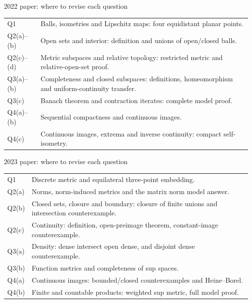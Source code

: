 \begin{note}{2022 paper: where to revise each question}
\begin{tabular}{p{.18\linewidth}p{.73\linewidth}}
Q1 & Balls, isometries and Lipschitz maps: four equidistant planar points.\\[3pt]
Q2(a)--(b) & Open sets and interior: definition and unions of open/closed balls.\\[3pt]
Q2(c)--(d) & Metric subspaces and relative topology: restricted metric and relative-open-set proof.\\[3pt]
Q3(a)--(b) & Completeness and closed subspaces: definitions, homeomorphism and uniform-continuity transfer.\\[3pt]
Q3(c) & Banach theorem and contraction iterates: complete model proof.\\[3pt]
Q4(a)--(b) & Sequential compactness and continuous images.\\[3pt]
Q4(c) & Continuous images, extrema and inverse continuity: compact self-isometry.
\end{tabular}
\end{note}
\begin{note}{2023 paper: where to revise each question}
\begin{tabular}{p{.18\linewidth}p{.73\linewidth}}
Q1 & Discrete metric and equilateral three-point embedding.\\[3pt]
Q2(a) & Norms, norm-induced metrics and the matrix norm model answer.\\[3pt]
Q2(b) & Closed sets, closure and boundary: closure of finite unions and intersection counterexample.\\[3pt]
Q2(c) & Continuity: definition, open-preimage theorem, constant-image counterexample.\\[3pt]
Q3(a) & Density: dense intersect open dense, and disjoint dense counterexample.\\[3pt]
Q3(b) & Function metrics and completeness of sup spaces.\\[3pt]
Q4(a) & Continuous images: bounded/closed counterexamples and Heine--Borel.\\[3pt]
Q4(b) & Finite and countable products: weighted sup metric, full model proof.
\end{tabular}
\end{note}

